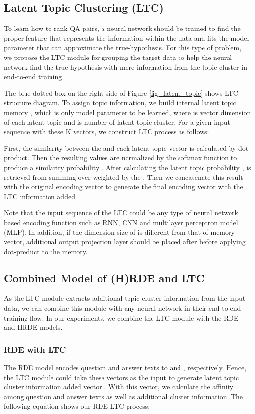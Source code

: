 \documentclass[11pt,a4paper]{article}
\begin{document}
\subsection{Latent Topic Clustering (LTC)}
To learn how to rank QA pairs, a neural network should be trained to find the proper feature that represents the information within the data and fits the model parameter that can approximate the true-hypothesis. For this type of problem, we propose the LTC module for grouping the target data to help the neural network find the true-hypothesis with more information from the topic cluster in end-to-end training. 

The blue-dotted box on the right-side of Figure \ref{fig_latent_topic} shows LTC structure diagram. To assign topic information, we build internal latent topic memory , which is only model parameter to be learned, where  is vector dimension of each latent topic and  is number of latent topic cluster.
For a given input sequence  with these K vectors, we construct LTC process as follows:


First, the similarity between the  and each latent topic vector is calculated by dot-product.
Then the resulting  values are  normalized by the softmax function  to produce a similarity probability .
After calculating the latent topic probability ,  is retrieved from summing over  weighted by the . Then we concatenate this result with the original encoding vector to generate the final encoding vector 
 with the LTC information added.

Note that the input sequence of the LTC could be any type of neural network based encoding function  such as RNN, CNN and multilayer perceptron model (MLP).
In addition, if the dimension size of  is different from that of memory vector, additional output projection layer should be placed after  before applying dot-product to the memory.


\subsection{Combined Model of (H)RDE and LTC}
As the LTC module extracts additional topic cluster information from the input data, we can combine this module with any neural network in their end-to-end training flow. In our experiments, we combine the LTC module with the RDE and HRDE models. 


\subsubsection{RDE with LTC}
The RDE model encodes question and answer texts to  and , respectively. Hence, the LTC module could take these vectors as the input to generate latent topic cluster information added vector . 
With this vector, we calculate the affinity among question and answer texts as well as additional cluster information.
The following equation shows our RDE-LTC process:
\end{document}
